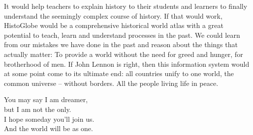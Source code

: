 It would help teachers to explain history to their students and learners to finally understand the seemingly complex course of history. If that would work, HistoGlobe would be a comprehensive historical world atlas with a great potential to teach, learn and understand processes in the past. We could learn from our mistakes we have done in the past and reason about the things that actually matter: To provide a world without the need for greed and hunger, for brotherhood of men. If John Lennon is right, then this information system would at some point come to its ultimate end: all countries unify to one world, the common universe -- without borders. All the people living life in peace.

\vspace{2em}
\begin{large}
\begin{quoteright}
  You may say I am dreamer, \\
  but I am not the only. \\
  I hope someday you'll join us. \\
  And the world will be as one.
\end{quoteright}
\end{large}




